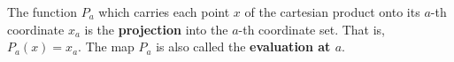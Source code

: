 The function $P_a$ which carries each point $x$ of the cartesian product onto its $a$-th coordinate $x_a$ is the \textbf{projection} into the $a$-th coordinate set. That is, $P_a(x) = x_a$. The map $P_a$ is also called the \textbf{evaluation at $a$}.
